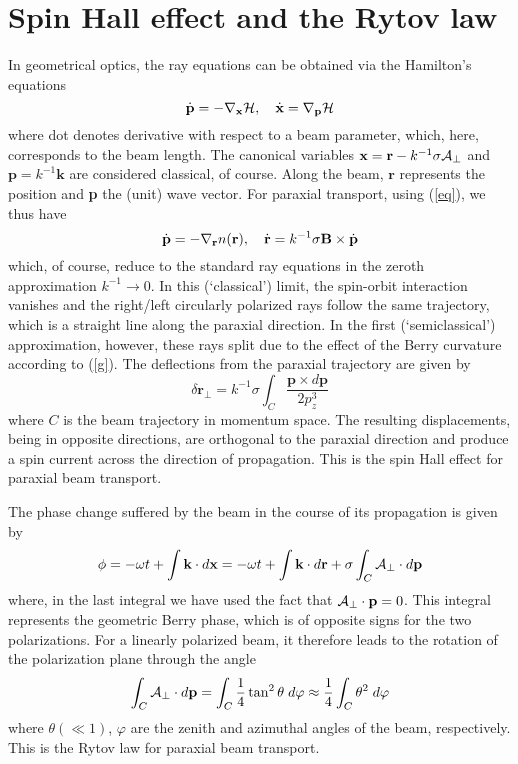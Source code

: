 \documentclass[aps,pra,preprint,superscriptaddress,showpacs,showkeys]{revtex4}
\begin{document}
\section{Spin Hall effect and the Rytov law}

In geometrical optics, the ray equations can be obtained \cite {Kratsov} via the Hamilton's equations 
$$
\dot{\textbf{p}}=-\nabla_\textbf{\scriptsize x}{\cal H}, \ \ \ \dot{\textbf{x}}=\nabla_\textbf{\scriptsize p}{\cal H}
$$
where dot denotes derivative with respect to a beam parameter, which, here, corresponds to the beam length. The canonical variables $\textbf{x}=\textbf{r}-k^{-1}\sigma {\bf {\cal A}}_\bot$ and $\textbf{p}=k^{-1}\textbf{k}$ are considered classical, of course. Along the beam, $\textbf{r}$ represents the position and \textbf{p} the (unit) wave vector. For paraxial transport, using (\ref{eq}), we thus have
\begin{equation}
\dot{\textbf{p}}=-\nabla_\textbf{\scriptsize r} n(\textbf{r}), \ \ \ \dot{\textbf{r}}=k^{-1}\sigma\textbf{B}\times \dot{\textbf{p}} \label{g}
\end{equation}
which, of course, reduce to the standard ray equations in the zeroth approximation $k^{-1} \rightarrow 0$. In this (`classical') limit, the spin-orbit interaction vanishes and the right/left circularly polarized rays follow the same trajectory, which is a straight line along the paraxial direction. In the first (`semiclassical') approximation, however, these rays split due to the effect of the Berry curvature according to (\ref{g}). The deflections from the paraxial trajectory are given by
$$
\delta\textbf{r}_\bot=k^{-1}\sigma\int_C \frac{\textbf{p}\times d\textbf{p}}{2p_z^3}
$$
where $C$ is the beam trajectory in momentum space. The resulting displacements, being in opposite directions, are orthogonal to the paraxial direction and produce a spin current across the direction of propagation. This is the spin Hall effect for paraxial beam transport.

The phase change suffered by the beam in the course of its propagation is given by
$$
\phi=-\omega t+\int \textbf{k} \cdot d\textbf{x}=-\omega t+ \int \textbf{k} \cdot d\textbf{r}+\sigma\int_C {\bf {\cal A}}_\bot\cdot d\textbf{p}
$$
where, in the last integral we have used the fact that ${\bf {\cal A}}_\bot\cdot \textbf{p}=0$. This integral represents the geometric Berry phase, which is of opposite signs for the two polarizations. For a linearly polarized beam, it therefore leads to the rotation of the polarization plane through the angle 
$$
\int_C {\bf {\cal A}}_\bot\cdot d\textbf{p}=\int_C \frac{1}{4}\tan^2\theta\; d\varphi \approx\frac{1}{4}\int_C \theta^2\; d\varphi
$$
where $\theta(\ll 1)$, $\varphi$  are the zenith and azimuthal angles of the beam, respectively. This is the Rytov law for paraxial beam transport.
\end{document}
